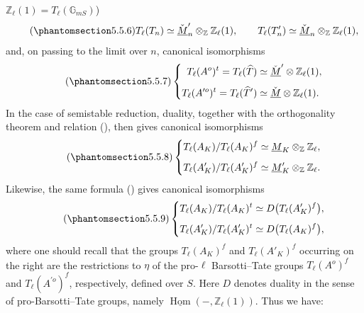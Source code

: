 $\mathbb Z_\ell(1)=T_\ell(\mathbb G_{mS})$)
\begin{equation}\tag{\SGARefTarget{sga7.sga7i.eix.n5-5-6}{5.5.6}}
 T_\ell(T_n)\simeq
 \check{\underline M}'_n\otimes_{\mathbb Z}\mathbb Z_\ell(1),
 \qquad
 T_\ell(T'_n)\simeq
 \check{\underline M}_n\otimes_{\mathbb Z}\mathbb Z_\ell(1),
\end{equation}
and, on passing to the limit over $n$, canonical isomorphisms
\begin{equation}\tag{\SGARefTarget{sga7.sga7i.eix.n5-5-7}{5.5.7}}
 \left\{
 \begin{aligned}
  T_\ell(A^o)^t=T_\ell(\widehat T)
   &\simeq \check{\underline M}'\otimes\mathbb Z_\ell(1),\\[1ex]
  T_\ell(A^{\prime o})^t=T_\ell(\widehat T')
   &\simeq \check{\underline M}\otimes\mathbb Z_\ell(1).
 \end{aligned}
 \right.
\end{equation}
In the case of semistable reduction, duality, together with the
orthogonality theorem  and relation (), then gives canonical
isomorphisms
\begin{equation}\tag{\SGARefTarget{sga7.sga7i.eix.n5-5-8}{5.5.8}}
 \left\{
 \begin{aligned}
  T_\ell(A_K)/T_\ell(A_K)^f
   &\simeq \underline M_K\otimes_{\mathbb Z}\mathbb Z_\ell,\\[1ex]
  T_\ell(A'_K)/T_\ell(A'_K)^f
   &\simeq \underline M'_K\otimes_{\mathbb Z}\mathbb Z_\ell.
 \end{aligned}
 \right.
\end{equation}
Likewise, the same formula () gives canonical isomorphisms
\begin{equation}\tag{\SGARefTarget{sga7.sga7i.eix.n5-5-9}{5.5.9}}
 \left\{
 \begin{aligned}
  T_\ell(A_K)/T_\ell(A_K)^t
   &\simeq D\bigl(T_\ell(A'_K)^f\bigr),\\[1ex]
  T_\ell(A'_K)/T_\ell(A'_K)^t
   &\simeq D\bigl(T_\ell(A_K)^f\bigr),
 \end{aligned}
 \right.
\end{equation}
where one should recall that the groups $T_\ell(A_K)^f$ and
$T_\ell(A'_K)^f$ occurring on the right are the restrictions to
$\eta$ of the pro-$\ell$ Barsotti--Tate groups $T_\ell(A^o)^f$ and
$T_\ell(A^{\prime o})^f$, respectively, defined over $S$. Here $D$
denotes duality in the sense of pro-Barsotti--Tate groups, namely
$\underline{\operatorname{Hom}}(-,\mathbb Z_\ell(1))$. Thus we have:

